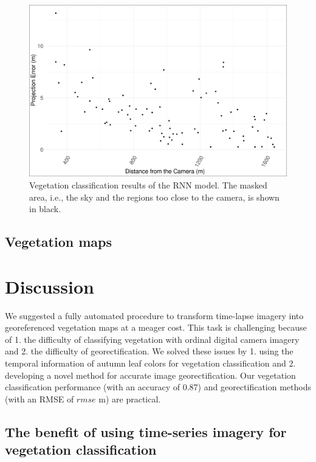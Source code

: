 \documentclass{article}
\begin{document}
\begin{figure}
\includegraphics[width=1\linewidth]{../results/georec_acc} \caption{Vegetation classification results of the RNN model. The masked area, i.e., the sky and the regions too close to the camera, is shown in black.}\label{fig:geoacc}
\end{figure}

\hypertarget{vegetation-maps}{%
\subsection{Vegetation maps}\label{vegetation-maps}}

\hypertarget{discussion}{%
\section{Discussion}\label{discussion}}

We suggested a fully automated procedure to transform time-lapse imagery into georeferenced vegetation maps at a meager cost. This task is challenging because of 1. the difficulty of classifying vegetation with ordinal digital camera imagery and 2. the difficulty of georectification. We solved these issues by 1. using the temporal information of autumn leaf colors for vegetation classification and 2. developing a novel method for accurate image georectification. Our vegetation classification performance (with an accuracy of 0.87) and georectification methods (with an RMSE of \(rmse\) m) are practical.

\hypertarget{the-benefit-of-using-time-series-imagery-for-vegetation-classification}{%
\subsection{The benefit of using time-series imagery for vegetation classification}\label{the-benefit-of-using-time-series-imagery-for-vegetation-classification}}
\end{document}

